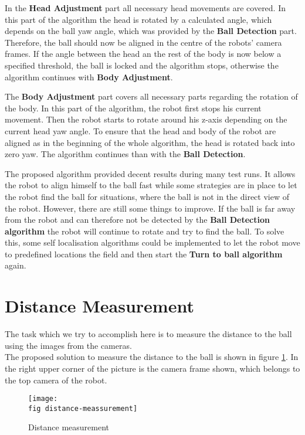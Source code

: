 In the \textbf{Head Adjustment} part all necessary head movements are covered. 
In this part of the algorithm the head is rotated by a calculated angle, which depends on the ball yaw angle, which was provided by the \textbf{Ball Detection} part.
Therefore, the ball should now be aligned in the centre of the robots' camera frames.
If the angle between the head an the rest of the body is now below a specified threshold, the ball is locked and the algorithm stops, otherwise the algorithm continues with \textbf{Body Adjustment}. 

The \textbf{Body Adjustment} part covers all necessary parts regarding the rotation of the body.
In this part of the algorithm, the robot first stops his current movement. Then the robot starts to rotate around his z-axis depending on the current head yaw angle. To ensure that the head and body of the robot are aligned as in the beginning of the whole algorithm, the head is rotated back into zero yaw. The algorithm continues than with the \textbf{Ball Detection}.

The proposed algorithm provided decent results during many test runs. It allows the robot to align himself to the ball fast while some strategies are in place to let the robot find the ball for situations, where the ball is not in the direct view of the robot. However, there are still some things to improve. If the ball is far away from the robot and can therefore not be detected by the \textbf{Ball Detection algorithm} the robot will continue to rotate and try to find the ball. To solve this, some self localisation algorithms could be implemented to let the robot move to predefined locations the field and then start the \textbf{Turn to ball algorithm} again.

\section{Distance Measurement}
\label{j sec distance measurement}
The task which we try to accomplish here is to measure the distance to the ball using the images from the cameras. \\
The proposed solution to measure the distance to the ball is shown in figure \ref{j figure distance measurement}. In the right upper corner of the picture is the camera frame shown, which belongs to the top camera of the robot.
\begin{figure}[ht]
	\texttt{[image: \\fig distance-meassurement]}
	\caption{Distance measurement}
	\label{j figure distance measurement}
\end{figure}

